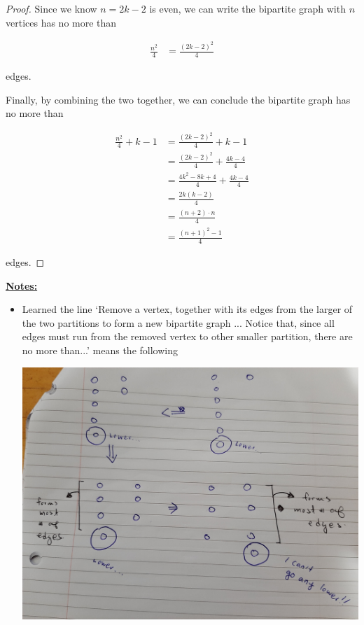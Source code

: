 \documentclass[12pt]{article}
\begin{document}
\begin{enumerate}[a.]
\begin{proof}
        \bigskip

        Since we know $n = 2k - 2$ is even, we can write the bipartite
        graph with $n$ vertices has no more than

        \begin{align}
            \frac{n^2}{4} &= \frac{(2k-2)^2}{4}
        \end{align}

        edges.

        \bigskip

        Finally, by combining the two together, we can conclude the
        bipartite graph has no more than

        \begin{align}
            \frac{n^2}{4} + k-1 &= \frac{(2k-2)^2}{4} + k-1\\
            &= \frac{(2k-2)^2}{4} + \frac{4k-4}{4}\\
            &= \frac{4k^2-8k+4}{4} + \frac{4k-4}{4}\\
            &= \frac{2k(k-2)}{4}\\
            &= \frac{(n+2) \cdot n}{4}\\
            &= \frac{(n+1)^2 - 1}{4}
        \end{align}

        edges.

    \end{proof}

    \newpage

    \underline{\textbf{Notes:}}

    \begin{itemize}
        \item Learned the line `Remove a vertex, together with its edges from the larger
        of the two partitions to form a new bipartite graph ... Notice that,
        since all edges must run from the removed vertex to other smaller partition,
        there are no more than...' means the following

        \begin{center}
        \includegraphics[width=0.8\linewidth]{images/assignment_1_q1c_note.jpg}
        \end{center}


\end{itemize}
\end{enumerate}
\end{document}
